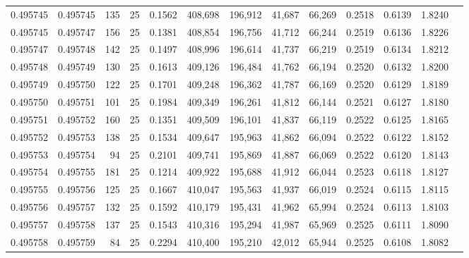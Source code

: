 \begin{tabular}{rrrrrrrrrrrrr}
0.495745 & 0.495745 &   135 &  25 &                                     0.1562 & 408,698 & 196,912 &  41,687 &  66,269 & 0.2518 & 0.6139 & 1.8240 \\
0.495745 & 0.495747 &   156 &  25 &                                     0.1381 & 408,854 & 196,756 &  41,712 &  66,244 & 0.2519 & 0.6136 & 1.8226 \\
0.495747 & 0.495748 &   142 &  25 &                                     0.1497 & 408,996 & 196,614 &  41,737 &  66,219 & 0.2519 & 0.6134 & 1.8212 \\
0.495748 & 0.495749 &   130 &  25 &                                     0.1613 & 409,126 & 196,484 &  41,762 &  66,194 & 0.2520 & 0.6132 & 1.8200 \\
0.495749 & 0.495750 &   122 &  25 &                                     0.1701 & 409,248 & 196,362 &  41,787 &  66,169 & 0.2520 & 0.6129 & 1.8189 \\
0.495750 & 0.495751 &   101 &  25 &                                     0.1984 & 409,349 & 196,261 &  41,812 &  66,144 & 0.2521 & 0.6127 & 1.8180 \\
0.495751 & 0.495752 &   160 &  25 &                                     0.1351 & 409,509 & 196,101 &  41,837 &  66,119 & 0.2522 & 0.6125 & 1.8165 \\
0.495752 & 0.495753 &   138 &  25 &                                     0.1534 & 409,647 & 195,963 &  41,862 &  66,094 & 0.2522 & 0.6122 & 1.8152 \\
0.495753 & 0.495754 &    94 &  25 &                                     0.2101 & 409,741 & 195,869 &  41,887 &  66,069 & 0.2522 & 0.6120 & 1.8143 \\
0.495754 & 0.495755 &   181 &  25 &                                     0.1214 & 409,922 & 195,688 &  41,912 &  66,044 & 0.2523 & 0.6118 & 1.8127 \\
0.495755 & 0.495756 &   125 &  25 &                                     0.1667 & 410,047 & 195,563 &  41,937 &  66,019 & 0.2524 & 0.6115 & 1.8115 \\
0.495756 & 0.495757 &   132 &  25 &                                     0.1592 & 410,179 & 195,431 &  41,962 &  65,994 & 0.2524 & 0.6113 & 1.8103 \\
0.495757 & 0.495758 &   137 &  25 &                                     0.1543 & 410,316 & 195,294 &  41,987 &  65,969 & 0.2525 & 0.6111 & 1.8090 \\
0.495758 & 0.495759 &    84 &  25 &                                     0.2294 & 410,400 & 195,210 &  42,012 &  65,944 & 0.2525 & 0.6108 & 1.8082 \\

\end{tabular}
